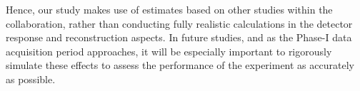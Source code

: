 Hence, our study makes use of estimates based on other studies within the
collaboration, rather than conducting fully realistic calculations in the
detector response and reconstruction aspects. In future studies, and as
the Phase\nobreakdash-I data acquisition period approaches, it will be
especially important to rigorously simulate these effects to assess the
performance of the experiment as accurately as possible.

